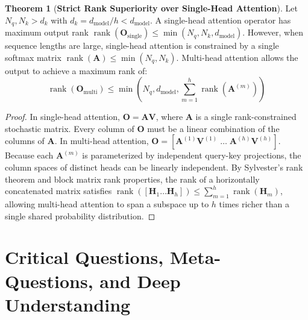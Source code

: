 \documentclass[11pt,a4paper]{article}
\theoremstyle{definition}
\newtheorem{theorem}{\textbf{Theorem}}[section]
\begin{document}
\begin{theorem}[\textbf{Strict Rank Superiority over Single-Head Attention}]
Let $N_q, N_k > d_k$ with $d_k = d_{\text{model}} / h < d_{\text{model}}$. A single-head attention operator has maximum output rank $\operatorname{rank}(\mathbf{O}_{\text{single}}) \le \min(N_q, N_k, d_{\text{model}})$. However, when sequence lengths are large, single-head attention is constrained by a single softmax matrix $\operatorname{rank}(\mathbf{A}) \le \min(N_q, N_k)$. Multi-head attention allows the output to achieve a maximum rank of:
{\boldmath
\begin{equation}
\operatorname{rank}(\mathbf{O}_{\text{multi}}) \le \min\left(N_q, d_{\text{model}}, \sum_{m=1}^h \operatorname{rank}(\mathbf{A}^{(m)})\right)
\end{equation}
}
\end{theorem}

\begin{proof}
In single-head attention, $\mathbf{O} = \mathbf{A}\mathbf{V}$, where $\mathbf{A}$ is a single rank-constrained stochastic matrix. Every column of $\mathbf{O}$ must be a linear combination of the columns of $\mathbf{A}$. In multi-head attention, $\mathbf{O} = [\mathbf{A}^{(1)}\mathbf{V}^{(1)} \; \dots \; \mathbf{A}^{(h)}\mathbf{V}^{(h)}]$. Because each $\mathbf{A}^{(m)}$ is parameterized by independent query-key projections, the column spaces of distinct heads can be linearly independent. By Sylvester's rank theorem and block matrix rank properties, the rank of a horizontally concatenated matrix satisfies $\operatorname{rank}([\mathbf{H}_1 \dots \mathbf{H}_h]) \le \sum_{m=1}^h \operatorname{rank}(\mathbf{H}_m)$, allowing multi-head attention to span a subspace up to $h$ times richer than a single shared probability distribution.
\end{proof}

\section{Critical Questions, Meta-Questions, and Deep Understanding}
\end{document}

